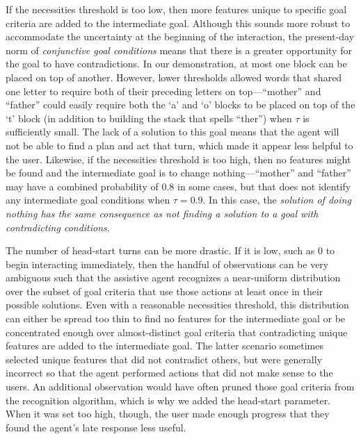 \documentclass[letterpaper]{article} %
\begin{document}
If the necessities threshold is too low, then more features unique to specific goal criteria are added to the intermediate goal.  Although this sounds more robust to accommodate the uncertainty at the beginning of the interaction, the present-day norm of \textit{conjunctive goal conditions} means that there is a greater opportunity for the goal to have contradictions.  In our demonstration, at most one block can be placed on top of another.  However, lower thresholds allowed words that shared one letter to require both of their preceding letters on top---``mother'' and ``father'' could easily require both the `a' and `o' blocks to be placed on top of the `t' block (in addition to building the stack that spells ``ther'') when $\tau$ is sufficiently small. 
 The lack of a solution to this goal means that the agent will not be able to find a plan and act that turn, which made it appear less helpful to the user.  Likewise, if the necessities threshold is too high, then no features might be found and the intermediate goal is to change nothing---``mother'' and ``father'' may have a combined probability of $0.8$ in some cases, but that does not identify any intermediate goal conditions when $\tau = 0.9$. 
 In this case, the \textit{solution of doing nothing has the same consequence as not finding a solution to a goal with contradicting conditions}.

The number of head-start turns can be more drastic.  If it is low, such as $0$ to begin interacting immediately, then the handful of observations can be very ambiguous such that the assistive agent recognizes a near-uniform distribution over the subset of goal criteria that use those actions at least once in their possible solutions.  Even with a reasonable necessities threshold, this distribution can either be spread too thin to find no features for the intermediate goal or be concentrated enough over almost-distinct goal criteria that contradicting unique features are added to the intermediate goal.  The latter scenario sometimes selected unique features that did not contradict others, but were generally incorrect so that the agent performed actions that did not make sense to the users.  An additional observation would have often pruned those goal criteria from the recognition algorithm, which is why we added the head-start parameter.  When it was set too high, though, the user made enough progress that they found the agent's late response less useful. %
\end{document}
